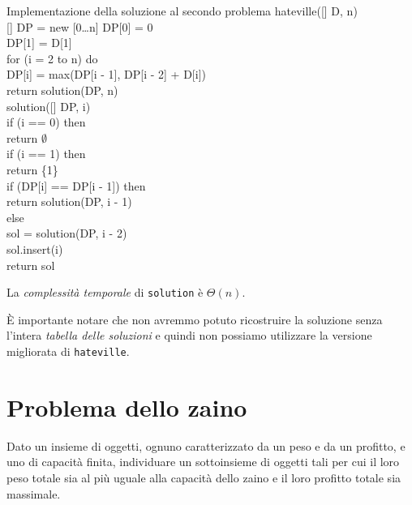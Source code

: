\begin{minicode}{Implementazione della soluzione al secondo problema}
\ind{} hateville([] D,  n)\\
    [] DP = new [0\dots n]\hfill{}
    DP[0] = 0\\
    DP[1] = D[1]\\
    \indf for (i = 2 to n) do\\
        DP[i] = max(DP[i - 1], DP[i - 2] + D[i])\\
    \indf return solution(DP, n)\\

\rmindent\ind{} solution([] DP,  i)\\
    \indf if (i == 0) then\\
        return $\emptyset$\\
    \indf if (i == 1) then\\
        return \{1\}\\
    \indf if (DP[i] == DP[i - 1]) then\\
        return solution(DP, i - 1)\\
    \indf else\\
         sol = solution(DP, i - 2)\\
        sol.insert(i)\\
        return sol\\
\end{minicode}\noindent
La \emph{complessità temporale} di \texttt{solution} è $\Theta(n)$.
\begin{note}
    È importante notare che non avremmo potuto ricostruire la soluzione senza
    l'intera \emph{tabella delle soluzioni} e quindi non possiamo utilizzare
    la versione migliorata di \texttt{hateville}.
\end{note}

\section{Problema dello zaino}
\begin{problem}
    Dato un insieme di oggetti, ognuno caratterizzato da un peso e da un profitto,
    e uno  di capacità finita, individuare un sottoinsieme di oggetti
    tali per cui il loro peso totale sia al più uguale alla capacità dello zaino
    e il loro profitto totale sia massimale.
\end{problem}

